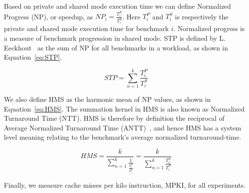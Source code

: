 Based on private and shared mode execution time we can define Normalized Progress (NP), or speedup, as ${NP}_i = \frac{T^{P}_i}{T^{S}_i}$.
Here $T^{P}_i$ and $T^{S}_i$ is respectively the private and shared mode execution time for benchmark $i$.
Normalized progress is a measure of benchmark progression in shared mode.
STP is defined by L. Eeckhout~\cite{Eeckhout2010} as the sum of NP for all benchmarks in a workload, as shown in Equation~\ref{eq:STP}.

\begin{equation} \label{eq:STP} 
 {STP} = {\sum\limits_{n=1}^{k}}\frac{T^{P}_i}{T^{S}_i}
\end{equation}

We also define HMS as the harmonic mean of NP values, as shown in Equation~\ref{eq:HMS}.
The summation kernel in HMS is also known as Normalized Turnaround Time (NTT).
HMS is therefore by definition the reciprocal of Average Normalized Turnaround Time (ANTT)~\cite{Eeckhout2010}, and hence HMS has a system level meaning relating to the benchmark's average normalized turnaround-time.

\begin{equation} \label{eq:HMS}
 {HMS} = \frac{k}{{\sum\limits_{n=1}^{k}\frac{1}{\frac{T^{P}_i}{T^{S}_i}}}} = \frac{k}{{\sum\limits_{n=1}^{k}\frac{T^{S}_i}{T^{P}_i}}}
\end{equation}

Finally, we measure cache misses per kilo instruction, MPKI, for all experiments.